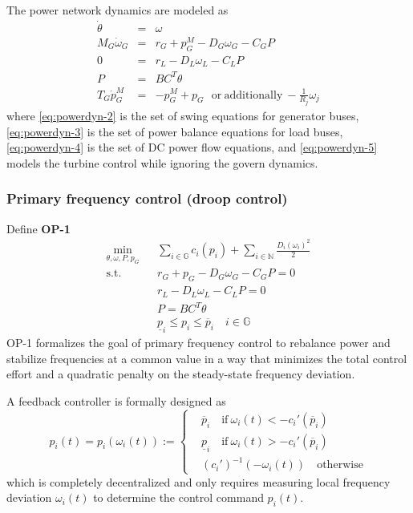 \documentclass[journal,12pt,onecolumn,draftclsnofoot]{IEEEtran}
\begin{document}
The power network dynamics are modeled as 
\begin{subequations}
\begin{eqnarray}
\label{eq:powerdyn-1}
 \dot \theta & = &  \omega \\
 \label{eq:powerdyn-2}
 M_G \dot \omega_G &  = & r_G + p_G^M - D_G \omega_G -  C_G P \\
 \label{eq:powerdyn-3}
 0 & = & r_L - D_L \omega_L - C_L P\\
 \label{eq:powerdyn-4}
 P & = & BC^T \theta \\
 \label{eq:powerdyn-5}
 T_G \dot p_G^M  & = & -p_G^M + p_G ~~~ \mathrm{or~additionally~} - \frac{1}{R_j}\omega_j
\end{eqnarray}\label{eq:powerdyn}%
\end{subequations}
where \eqref{eq:powerdyn-2} is the set of swing equations for generator buses, \eqref{eq:powerdyn-3} is the set of power balance equations for load buses, \eqref{eq:powerdyn-4} is the set of DC power flow equations, and \eqref{eq:powerdyn-5} models the turbine control while ignoring the govern dynamics. 

\subsubsection{Primary frequency control (droop control) \cite{zhao2016unified}} 
Define 
\noindent
\textbf{OP-1}
\begin{subequations}
\begin{eqnarray}
   \min_{\theta, \omega, P, p_G} && \sum_{i\in\mathbb{G}} c_i(p_i) +\sum_{i\in\mathbb{N}} \frac{D_i (\omega_i)^2}{2} \\
   \mathrm{s.t.} && r_G+p_G-D_G\omega_G-C_G P=0 \\
   && r_L-D_L\omega_L-C_LP=0\\
   && P=BC^T\theta\\
   \label{eq:OP1-5}
   && \underline{p}_i \le p_i \le \overline{p}_i \quad   i \in \mathbb{G}
\end{eqnarray}\label{eq:OP1}%
\end{subequations}
OP-1 formalizes the goal of primary frequency control to rebalance power and stabilize frequencies at a common value in a way that minimizes the total control effort and a quadratic penalty on the steady-state frequency deviation.

A feedback controller is formally designed as
\begin{equation}\label{eq:genprictr}
p_i(t)=p_i(\omega_i(t)):=\left\{
\begin{split}
& \overline{p}_i   \quad  \mathrm{if~}\omega_i(t) < -c_i'(\overline{p}_i)\\
& \underline{p}_i   \quad \mathrm{if~} \omega_i(t) > -c_i'(\overline{p}_i) \\
& (c_i')^{-1}(-\omega_i(t)) \quad \mathrm{otherwise}
\end{split}\right.
\end{equation}
which is completely decentralized and only requires measuring local frequency deviation $\omega_i(t)$ to determine the control command $p_i(t)$.
\end{document}
